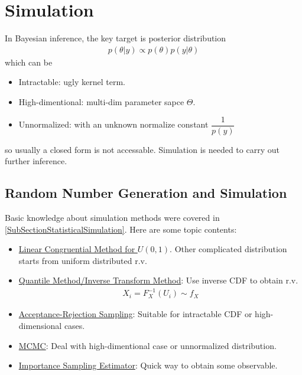     
\section{Simulation}\label{SubSectionBayesianStatisticsSimulation}

In Bayesian inference, the key target is posterior distribution
\begin{align}
    p(\theta |y)\propto p(\theta )p(y|\theta ) 
\end{align}
which can be 
\begin{itemize}[topsep=2pt,itemsep=0pt]
    \item Intractable: ugly kernel term.
    \item High-dimentional: multi-dim parameter sapce $ \Theta $.
    \item Unnormalized: with an unknown normalize constant $ 
    \dfrac{ 1 }{ p(y) }   $
\end{itemize}

so usually a closed form is not accessable. Simulation is needed to carry out further inference.

    


\subsection{Random Number Generation and Simulation}

Basic knowledge about simulation methods were covered in \autoref{SubSectionStatisticalSimulation}. Here are some topic contents:
\begin{itemize}[topsep=2pt,itemsep=0pt]
    \item \hyperlink{StatisticalSimulationLCM}{Linear Congruential Method for $ U(0,1) $}. Other complicated distribution starts from uniform distributed r.v.
    \item \hyperlink{StatisticalSimulationInverseTrans}{Quantile Method/Inverse Transform Method}: Use inverse CDF to obtain r.v.
    \begin{align}
        X_i=F_X^{-1}(U_i)\sim f_X 
    \end{align}
    \item \hyperlink{StatisticalSimulationARS}{Acceptance-Rejection Sampling}: Suitable for intractable CDF or high-dimensional cases.
    \item \hyperlink{StatisticalSimulationInverseTransMCMC}{MCMC}: Deal with high-dimentional case or unnormalized distribution.
    \item \hyperlink{StatisticalSimulationInverseTransImportanceSampli}{Importance Sampling Estimator}: Quick way to obtain some observable.
\end{itemize}

